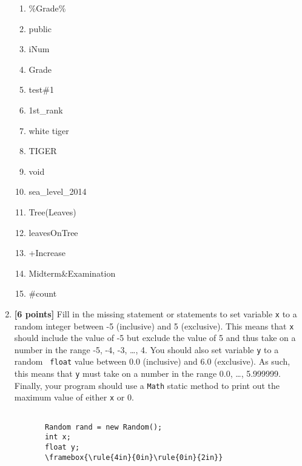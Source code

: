 \documentclass[11pt]{report}
\begin{document}
\begin{enumerate}
\begin{enumerate}
  \item \%Grade\%
  \item public
  \item iNum
  \item Grade
  \item test\#1
  \item 1st\_rank
  \item white tiger
  \item TIGER
    \item void
  \item sea\_level\_2014
  \item Tree(Leaves)
  \item leavesOnTree
    \item +Increase
  \item Midterm\&Examination
    \item \#count
\end{enumerate}
\bigskip

\item {\bf [6 points]} Fill in the missing statement or statements to set variable {\tt x} to a random integer between
  -5 (inclusive) and 5 (exclusive).  This means that {\tt x} should include the value of -5 but exclude the value of 5
  and thus take on a number in the range -5, -4, -3, \ldots, 4. You should also set variable {\tt y} to a random {\tt
    float} value between 0.0 (inclusive) and 6.0 (exclusive). As such, this means that {\tt y} must take on a number in
  the range 0.0, \ldots, 5.999999. Finally, your program should use a {\tt Math} static method to print out the maximum
  value of either {\tt x} or 0.

\begin{Verbatim}[commandchars=\\\{\}]

       Random rand = new Random();
       int x;
       float y;
       \framebox{\rule{4in}{0in}\rule{0in}{2in}}
\end{Verbatim}

\newpage



\end{enumerate}
\end{document}
